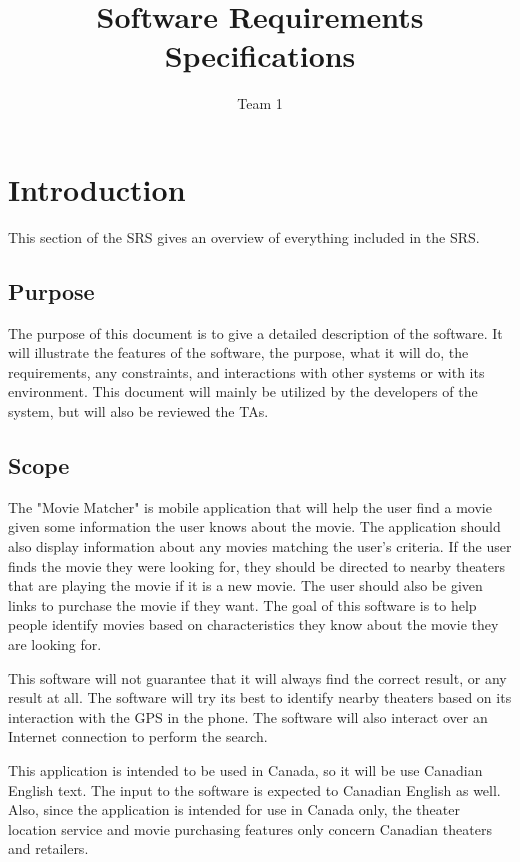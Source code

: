 \documentclass[]{article}
\title{Software Requirements Specifications}
\author{Team 1}
\newcommand{\sname}{Movie Matcher}
\begin{document}
\maketitle	

\section{Introduction}
\label{sec:introduction}

This section of the SRS gives an overview of everything included in the SRS.

\subsection{Purpose}
\label{sub:purpose}
The purpose of this document is to give a detailed description of the software. It will illustrate the features of the software, the purpose, what it will do, the requirements, any constraints, and interactions with other systems or with its environment. This document will mainly be utilized by the developers of the system, but will also be reviewed the TAs.

\subsection{Scope}
\label{sub:scope}
The "\sname" is mobile application that will help the user find a movie given some information the user knows about the movie. The application should also display information about any movies matching the user's criteria. If the user finds the movie they were looking for, they should be directed to nearby theaters that are playing the movie if it is a new movie. The user should also be given links to purchase the movie if they want. The goal of this software is to help people identify movies based on characteristics they know about the movie they are looking for. 

This software will not guarantee that it will always find the correct result, or any result at all. The software will try its best to identify nearby theaters based on its interaction with the GPS in the phone. The software will also interact over an Internet connection to perform the search.

This application is intended to be used in Canada, so it will be use Canadian English text. The input to the software is expected to Canadian English as well. Also, since the application is intended for use in Canada only, the theater location service and movie purchasing features only concern Canadian theaters and retailers.
\end{document}
